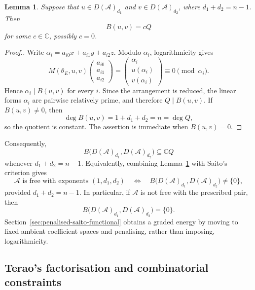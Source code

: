 \documentclass[pdflatex,sn-mathphys-num]{sn-jnl}%
\newtheorem{lemma}{Lemma}
\theoremstyle{remark}
\theoremstyle{definition}
\begin{document}
\begin{lemma}
\label{lem:divisibility-obstruction}
Suppose that $u\in D(\mathcal{A})_{d_1}$ and $v\in D(\mathcal{A})_{d_2}$, where $d_1+d_2=n-1$. Then
\[
B(u,v)=cQ
\]
for some $c\in\mathbb C$, possibly $c=0$.
\end{lemma}

\begin{proof}[Proof.]
Write $\alpha_i=a_{i0}x+a_{i1}y+a_{i2}z$. Modulo $\alpha_i$, logarithmicity gives
\[
M(\theta_E,u,v)
\begin{pmatrix}
a_{i0}\\a_{i1}\\a_{i2}
\end{pmatrix}
=
\begin{pmatrix}
\alpha_i\\u(\alpha_i)\\v(\alpha_i)
\end{pmatrix}
\equiv0\pmod{\alpha_i}.
\]
Hence $\alpha_i\mid B(u,v)$ for every $i$. Since the arrangement is reduced, the linear forms $\alpha_i$ are pairwise relatively prime, and therefore $Q\mid B(u,v)$. If $B(u,v)\neq0$, then
\[
\deg B(u,v)=1+d_1+d_2=n=\deg Q,
\]
so the quotient is constant. The assertion is immediate when $B(u,v)=0$.
\end{proof}

Consequently,
\begin{equation}
\label{eq:exact-determinant-line}
B\bigl(D(\mathcal{A})_{d_1},D(\mathcal{A})_{d_2}\bigr)
\subseteq\mathbb C Q
\end{equation}
whenever $d_1+d_2=n-1$. Equivalently, combining Lemma~\ref{lem:divisibility-obstruction} with Saito's criterion gives
\begin{equation}
\label{eq:target-pair-Saito}
\mathcal{A}\text{ is free with exponents }(1,d_1,d_2)
\quad\Longleftrightarrow\quad
B\bigl(D(\mathcal{A})_{d_1},D(\mathcal{A})_{d_2}\bigr)\neq\{0\},
\end{equation}
provided $d_1+d_2=n-1$. In particular, if $\mathcal{A}$ is not free with the prescribed pair, then
\begin{equation}
\label{eq:kernel-determinant-zero}
B\bigl(D(\mathcal{A})_{d_1},D(\mathcal{A})_{d_2}\bigr)=\{0\}.
\end{equation}
Section~\ref{sec:penalised-saito-functional} obtains a graded energy by moving to fixed ambient coefficient spaces and penalising, rather than imposing, logarithmicity.

\subsection{Terao's factorisation and combinatorial constraints}
\label{subsec:numerical-constraints}
\end{document}
